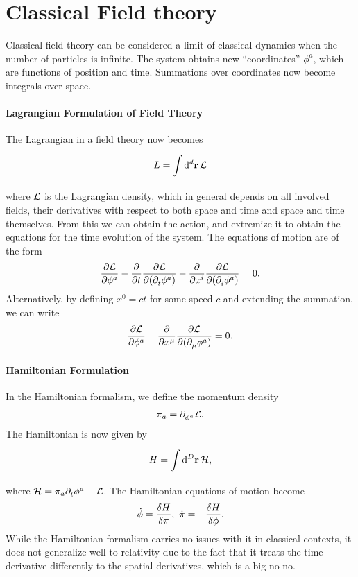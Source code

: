 \section{Classical Field theory}

Classical field theory can be considered a limit of classical dynamics when the number of particles is infinite. The system obtains new ``coordinates'' $\phi^{a}$, which are functions of position and time. Summations over coordinates now become integrals over space.

\paragraph{Lagrangian Formulation of Field Theory}
The Lagrangian in a field theory now becomes
\begin{align*}
	L = \int\limits_{}^{}\dd[d]{\vb{r}}\mathcal{L}
\end{align*}
where $\mathcal{L}$ is the Lagrangian density, which in general depends on all involved fields, their derivatives with respect to both space and time and space and time themselves. From this we can obtain the action, and extremize it to obtain the equations for the time evolution of the system. The equations of motion are of the form
\begin{align*}
	\pdv{\ensuremath{\mathcal{L}}}{\phi^{a}} - \pdv{t}\pdv{\ensuremath{\mathcal{L}}}{(\partial^{}_{t}\phi^{a})} - \pdv{x^{i}}\pdv{\ensuremath{\mathcal{L}}}{(\partial^{}_{i}\phi^{a})} = 0.
\end{align*}
Alternatively, by defining $x^{0} = ct$ for some speed $c$ and extending the summation, we can write
\begin{align*}
	\pdv{\ensuremath{\mathcal{L}}}{\phi^{a}} - \pdv{x^{\mu}}\pdv{\ensuremath{\mathcal{L}}}{(\partial^{}_{\mu}\phi^{a})} = 0.
\end{align*}




\paragraph{Hamiltonian Formulation}
In the Hamiltonian formalism, we define the momentum density
\begin{align*}
	\pi_{a} = \partial^{}_{\phi^{a}}\mathcal{L}.
\end{align*}
The Hamiltonian is now given by
\begin{align*}
	H = \int\limits_{}^{}\dd[D]{\vb{r}}\mathcal{H},
\end{align*}
where $\mathcal{H} = \pi_{a}\partial^{}_{t}\phi^{a} - \mathcal{L}$. The Hamiltonian equations of motion become
\begin{align*}
	\dot{\phi} = \fdv{H}{\pi},\ \dot{\pi} = -\fdv{H}{\phi}.
\end{align*}
While the Hamiltonian formalism carries no issues with it in classical contexts, it does not generalize well to relativity due to the fact that it treats the time derivative differently to the spatial derivatives, which is a big no-no.

